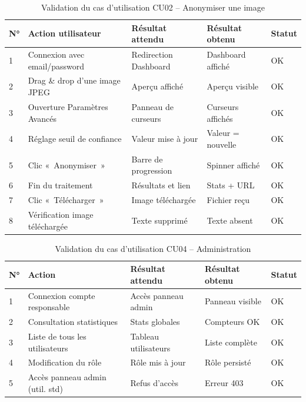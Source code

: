\begin{table}[H]
\centering
\caption{Validation du cas d'utilisation CU02 -- Anonymiser une image}
\label{tab:cu02}
\begin{tabularx}{\textwidth}{p{0.5cm} X p{3.5cm} p{1.5cm} p{1cm}}
\toprule
\textbf{N°} & \textbf{Action utilisateur} & \textbf{Résultat attendu} & \textbf{Résultat obtenu} & \textbf{Statut} \\
\midrule
1 & Connexion avec email/password  & Redirection Dashboard & Dashboard affiché & \textcolor{green!60!black}{OK} \\
2 & Drag \& drop d'une image JPEG  & Aperçu affiché        & Aperçu visible    & \textcolor{green!60!black}{OK} \\
3 & Ouverture Paramètres Avancés  & Panneau de curseurs   & Curseurs affichés & \textcolor{green!60!black}{OK} \\
4 & Réglage seuil de confiance     & Valeur mise à jour    & Valeur = nouvelle & \textcolor{green!60!black}{OK} \\
5 & Clic «~Anonymiser~»           & Barre de progression  & Spinner affiché   & \textcolor{green!60!black}{OK} \\
6 & Fin du traitement              & Résultats et lien     & Stats + URL       & \textcolor{green!60!black}{OK} \\
7 & Clic «~Télécharger~»          & Image téléchargée     & Fichier reçu      & \textcolor{green!60!black}{OK} \\
8 & Vérification image téléchargée & Texte supprimé        & Texte absent      & \textcolor{green!60!black}{OK} \\
\bottomrule
\end{tabularx}
\end{table}

\begin{table}[H]
\centering
\caption{Validation du cas d'utilisation CU04 -- Administration}
\label{tab:cu04}
\begin{tabularx}{\textwidth}{p{0.5cm} X p{3.5cm} p{1.5cm} p{1cm}}
\toprule
\textbf{N°} & \textbf{Action} & \textbf{Résultat attendu} & \textbf{Résultat obtenu} & \textbf{Statut} \\
\midrule
1 & Connexion compte responsable   & Accès panneau admin   & Panneau visible & \textcolor{green!60!black}{OK} \\
2 & Consultation statistiques      & Stats globales        & Compteurs OK    & \textcolor{green!60!black}{OK} \\
3 & Liste de tous les utilisateurs & Tableau utilisateurs  & Liste complète  & \textcolor{green!60!black}{OK} \\
4 & Modification du rôle           & Rôle mis à jour       & Rôle persisté   & \textcolor{green!60!black}{OK} \\
5 & Accès panneau admin (util. std)& Refus d'accès         & Erreur 403      & \textcolor{green!60!black}{OK} \\
\bottomrule
\end{tabularx}
\end{table}

